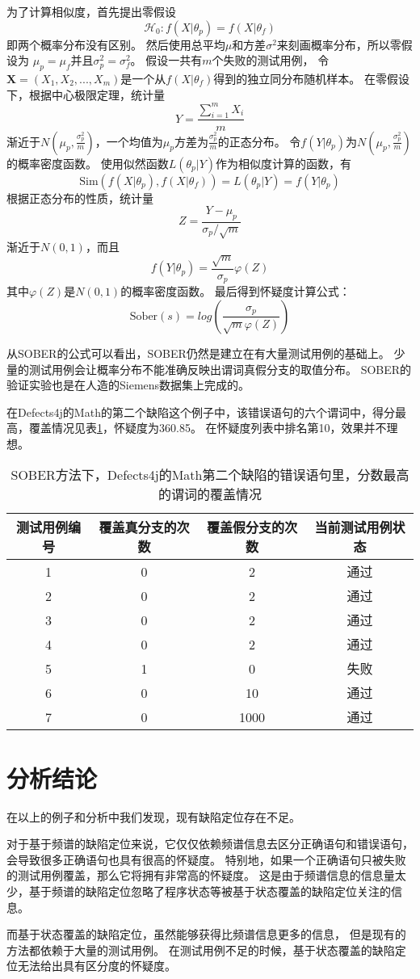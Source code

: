 为了计算相似度，首先提出零假设
$$\mathcal{H}_0 : f(X|\theta_p) = f(X|\theta_f)$$
即两个概率分布没有区别。
然后使用总平均$\mu$和方差$\sigma^2$来刻画概率分布，所以零假设为
$\mu_p = \mu_f$并且$\sigma_p^2 = \sigma_f^2$。
假设一共有$m$个失败的测试用例，
令$\textbf{X} = (X_1, X_2, ..., X_m)$是一个从$f(X|\theta_f)$得到的独立同分布随机样本。
在零假设下，根据中心极限定理，统计量
$$
Y = \frac{\sum_{i = 1}^m X_i}{m}
$$
渐近于$N(\mu_p, \frac{\sigma_p^2}{m})$，一个均值为$\mu_p$方差为$\frac{\sigma_p^2}{m}$的正态分布。
令$f(Y|\theta_p)$为$N(\mu_p, \frac{\sigma_p^2}{m})$的概率密度函数。
使用似然函数$L(\theta_p | Y)$作为相似度计算的函数，有
$$
\mathrm{Sim}(f(X|\theta_p), f(X|\theta_f)) = L(\theta_p | Y) = f(Y|\theta_p)
$$
根据正态分布的性质，统计量
$$
Z = \frac{Y - \mu_p}{\sigma_p / \sqrt{m}}
$$
渐近于$N(0,1)$，而且
$$
f(Y|\theta_p) = \frac{\sqrt{m}}{\sigma_p}\varphi(Z)
$$
其中$\varphi(Z)$是$N(0,1)$的概率密度函数。
最后得到怀疑度计算公式：
$$
\mathrm{Sober}(s) = log\left( \frac{\sigma_p}{\sqrt{m}\varphi(Z)} \right)
$$

从SOBER的公式可以看出，SOBER仍然是建立在有大量测试用例的基础上。
少量的测试用例会让概率分布不能准确反映出谓词真假分支的取值分布。
SOBER的验证实验也是在人造的Siemens数据集上完成的。

在Defects4j的Math的第二个缺陷这个例子中，该错误语句的六个谓词中，得分最高，覆盖情况见表\ref{math_2_sober}，怀疑度为360.85。
在怀疑度列表中排名第10，效果并不理想。

\begin{table}
\centering
\begin{tabular}{|c|c|c|c|}
\hline
测试用例编号 & 覆盖真分支的次数 & 覆盖假分支的次数 & 当前测试用例状态 \\
\hline
1 & 0 & 2 & 通过 \\
\hline
2 & 0 & 2 & 通过 \\
\hline
3 & 0 & 2 & 通过 \\
\hline
4 & 0 & 2 & 通过 \\
\hline
5 & 1 & 0 & 失败 \\
\hline
6 & 0 & 10 & 通过 \\
\hline
7 & 0 & 1000 & 通过 \\
\hline
\end{tabular}
\caption{SOBER方法下，Defects4j的Math第二个缺陷的错误语句里，分数最高的谓词的覆盖情况}
\label{math_2_sober}
\end{table}

\section{分析结论}

在以上的例子和分析中我们发现，现有缺陷定位存在不足。

对于基于频谱的缺陷定位来说，它仅仅依赖频谱信息去区分正确语句和错误语句，
会导致很多正确语句也具有很高的怀疑度。
特别地，如果一个正确语句只被失败的测试用例覆盖，那么它将拥有非常高的怀疑度。
这是由于频谱信息的信息量太少，基于频谱的缺陷定位忽略了程序状态等被基于状态覆盖的缺陷定位关注的信息。

而基于状态覆盖的缺陷定位，虽然能够获得比频谱信息更多的信息，
但是现有的方法都依赖于大量的测试用例。
在测试用例不足的时候，基于状态覆盖的缺陷定位无法给出具有区分度的怀疑度。
